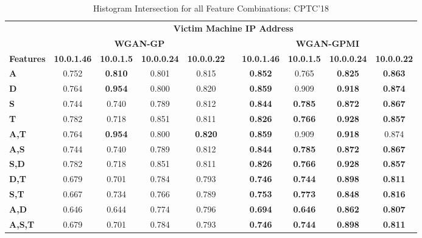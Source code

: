 \begin{table}[!htbp]
	\caption{Histogram Intersection for all Feature Combinations: CPTC'18}
	\label{tab:inter18}
	\centering
	\begin{adjustbox}{angle=90}
		\begin{tabular}{l|c|c|c|c|c|c|c|c|c|}
			\multicolumn{1}{c|}{\textbf{}} & \multicolumn{9}{c|}{\textbf{Victim Machine IP Address}} \\
			\multicolumn{1}{c|}{} & \multicolumn{4}{c|}{\textbf{WGAN-GP}} &  & \multicolumn{4}{c|}{\textbf{WGAN-GPMI}} \\
			\multicolumn{1}{c|}{\textbf{Features}} & \textbf{10.0.1.46} & \textbf{10.0.1.5} & \textbf{10.0.0.24} & \textbf{10.0.0.22} &  & \textbf{10.0.1.46} & \textbf{10.0.1.5} & \textbf{10.0.0.24} & \textbf{10.0.0.22} \\ \hline
			\textbf{A} & 0.752 & \textbf{0.810} & 0.801 & 0.815 &  & \textbf{0.852} & 0.765 & \textbf{0.825} & \textbf{0.863} \\
			\textbf{D} & 0.764 & \textbf{0.954} & 0.800 & 0.820 &  & \textbf{0.859} & 0.909 & \textbf{0.918} & \textbf{0.874} \\
			\textbf{S} & 0.744 & 0.740 & 0.789 & 0.812 &  & \textbf{0.844} & \textbf{0.785} & \textbf{0.872} & \textbf{0.867} \\
			\textbf{T} & 0.782 & 0.718 & 0.851 & 0.811 &  & \textbf{0.826} & \textbf{0.766} & \textbf{0.928} & \textbf{0.857} \\ \hline
			\textbf{A,T} & 0.764 & \textbf{0.954} & 0.800 & \textbf{0.820} &  & \textbf{0.859} & 0.909 & \textbf{0.918} & 0.874 \\
			\textbf{A,S} & 0.744 & 0.740 & 0.789 & 0.812 &  & \textbf{0.844} & \textbf{0.785} & \textbf{0.872} & \textbf{0.867} \\
			\textbf{S,D} & 0.782 & 0.718 & 0.851 & 0.811 &  & \textbf{0.826} & \textbf{0.766} & \textbf{0.928} & \textbf{0.857} \\
			\textbf{D,T} & 0.679 & 0.701 & 0.784 & 0.793 &  & \textbf{0.746} & \textbf{0.744} & \textbf{0.898} & \textbf{0.811} \\
			\textbf{S,T} & 0.667 & 0.734 & 0.766 & 0.789 &  & \textbf{0.753} & \textbf{0.773} & \textbf{0.848} & \textbf{0.816} \\
			\textbf{A,D} & 0.646 & 0.644 & 0.774 & 0.796 &  & \textbf{0.694} & \textbf{0.646} & \textbf{0.862} & \textbf{0.807} \\ \hline
			\textbf{A,S,T} & 0.679 & 0.701 & 0.784 & 0.793 &  & \textbf{0.746} & \textbf{0.744} & \textbf{0.898} & \textbf{0.811} \\

\end{tabular}
\end{adjustbox}
\end{table}
